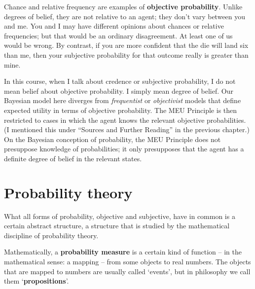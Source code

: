 Chance and relative frequency are examples of \textbf{objective probability}.
Unlike degrees of belief, they are not relative to an agent; they don't vary
between you and me. You and I may have different opinions about chances or
relative frequencies; but that would be an ordinary disagreement. At least
one of us would be wrong. By contrast, if you are more confident that the die
will land six than me, then your subjective probability for that outcome really
is greater than mine.

In this course, when I talk about credence or subjective probability, I do not
mean belief about objective probability. I simply mean degree of belief.
%
%
Our Bayesian model here diverges from \emph{frequentist} or \emph{objectivist}
models that define expected utility in terms of objective probability. The MEU
Principle is then restricted to cases in which the agent knows the relevant
objective probabilities. (I mentioned this under ``Sources and Further Reading''
in the previous chapter.) On the Bayesian conception of probability, the MEU
Principle does not presuppose knowledge of probabilities; it only presupposes
that the agent has a definite degree of belief in the relevant states.


\section{Probability theory}

What all forms of probability, objective and subjective, have in common is a
certain abstract structure, a structure that is studied by the mathematical
discipline of probability theory.

Mathematically, a \textbf{probability measure} is a certain kind of function --
in the mathematical sense: a mapping -- from some objects to real numbers. The
objects that are mapped to numbers are usually called `events', but in
philosophy we call them `\textbf{propositions}'.

